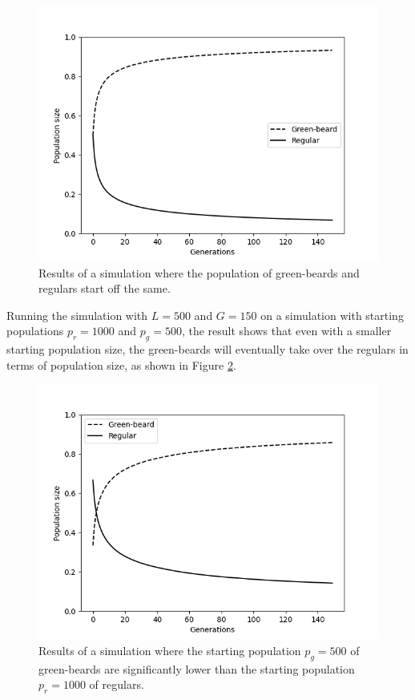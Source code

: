 \documentclass[conference]{IEEEtran}
\begin{document}
	\begin{figure}[htbp]
		\centerline{\includegraphics[scale=0.5]{figures/50-50.png}}
		\caption{Results of a simulation where the population of green-beards and regulars start off the same.}
		\label{fig:50-50}
	\end{figure}
	
	Running the simulation with $L = 500$ and $G = 150$ on a simulation with starting populations $p_r = 1000$ and $p_g = 500$, the result shows that even with a smaller starting population size, the green-beards will eventually take over the regulars in terms of population size, as shown in Figure \ref{fig:1000-500}.

	\begin{figure}[htbp]
		\centerline{\includegraphics[scale=0.5]{figures/1000-500.png}}
		\caption{Results of a simulation where the starting population $p_g = 500$ of green-beards are significantly lower than the starting population $p_r = 1000$ of regulars.}
		\label{fig:1000-500}
	\end{figure}
\end{document}
